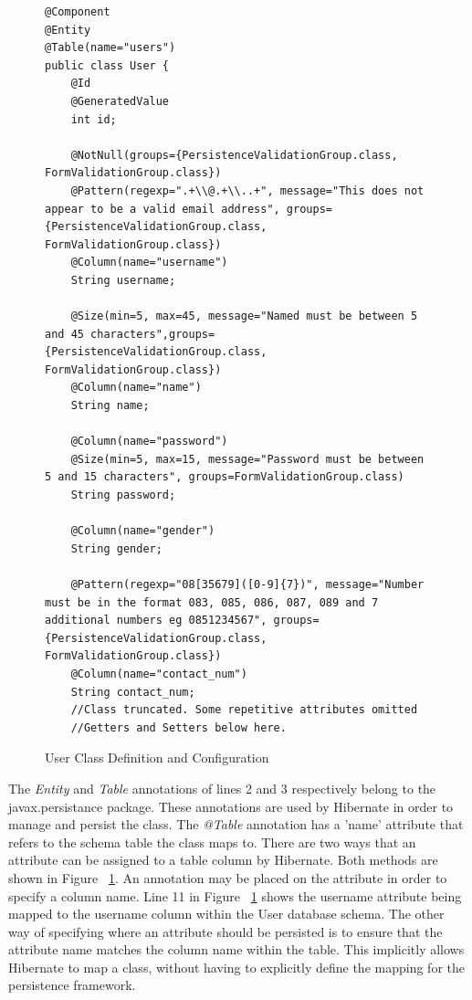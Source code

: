\begin{figure}[H]
\begin{lstlisting}
@Component
@Entity
@Table(name="users")
public class User {
	@Id
	@GeneratedValue
	int id;
	
	@NotNull(groups={PersistenceValidationGroup.class, FormValidationGroup.class})
	@Pattern(regexp=".+\\@.+\\..+", message="This does not appear to be a valid email address", groups={PersistenceValidationGroup.class, FormValidationGroup.class})
	@Column(name="username")
	String username;
	
	@Size(min=5, max=45, message="Named must be between 5 and 45 characters",groups={PersistenceValidationGroup.class, FormValidationGroup.class})
	@Column(name="name")
	String name;
	
	@Column(name="password")
	@Size(min=5, max=15, message="Password must be between 5 and 15 characters", groups=FormValidationGroup.class)
	String password;
	
	@Column(name="gender")
	String gender;
	
	@Pattern(regexp="08[35679]([0-9]{7})", message="Number must be in the format 083, 085, 086, 087, 089 and 7 additional numbers eg 0851234567", groups={PersistenceValidationGroup.class, FormValidationGroup.class})
	@Column(name="contact_num")
	String contact_num;
	//Class truncated. Some repetitive attributes omitted
	//Getters and Setters below here.
\end{lstlisting}
\caption{User Class Definition and Configuration}
\label{fig:userDef}
\end{figure}

The \textit{Entity} and \textit{Table} annotations of lines 2 and 3 respectively belong to the javax.persistance package. These annotations are used by Hibernate in order to manage and persist the class. The \textit{@Table} annotation has a 'name' attribute that refers to the schema table the class maps to. There are two ways that an attribute can be assigned to a table column by Hibernate. Both methods are shown in Figure ~\ref{fig:userDef}. An annotation may be placed on the attribute in order to specify a column name. Line 11 in Figure ~\ref{fig:userDef} shows the username attribute being mapped to the username column within the User database schema. The other way of specifying where an attribute should be persisted is to ensure that the attribute name matches the column name within the table. This implicitly allows Hibernate to map a class, without having to explicitly define the mapping for the persistence framework.

